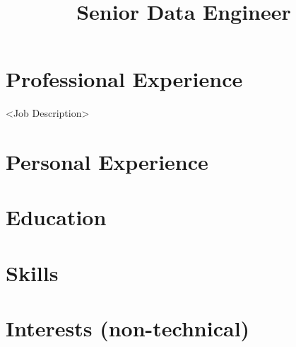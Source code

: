 \documentclass[letter,10pt]{res}
\begin{document}

\begin{resume}

    \section{Professional Experience}

    \title{Senior Data Engineer}
    \begin{position}
        <Job Description>
    \end{position}
    
    \section{Personal Experience}
    \section{Education}
    \section{Skills}
    \section{Interests (non-technical)}

\end{resume}
\end{document}

